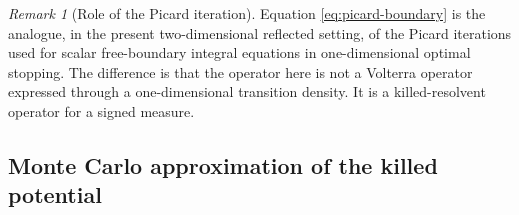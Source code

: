 \documentclass[pdflatex,sn-mathphys-num]{sn-jnl}
\theoremstyle{plain}
\theoremstyle{definition}
\theoremstyle{remark}
\newtheorem{remark}[theorem]{Remark}
\numberwithin{equation}{section}
\begin{document}
\begin{remark}[Role of the Picard iteration] \label{rem:picard-role} 
Equation \eqref{eq:picard-boundary} is the analogue, in the present two-dimensional reflected setting, of the Picard iterations used for scalar free-boundary integral equations in one-dimensional optimal stopping. The difference is that the operator here is not a Volterra operator expressed through a one-dimensional transition density. It is a killed-resolvent operator for a signed measure. 
\end{remark} 

\subsection{Monte Carlo approximation of the killed potential} \label{subsec:mc-killed-potential} 
\end{document}

